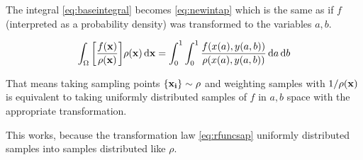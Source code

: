 The integral \cref{eq:baseintegral} becomes \cref{eq:newintap} which
is the same as if \(f\) (interpreted as a probability density) was
transformed to the variables \(a, b\).

\begin{equation}
  \label{eq:newintap}
  \int_\Omega
  \qty[\frac{f(\vb{x})}{\rho(\vb{x})}] \rho(\vb{x}) \dd{\vb{x}} =
  \int_0^1\int_0^1 \frac{f(x(a), y(a,b))}{\rho(x(a), y(a, b))} \dd{a}\dd{b}
\end{equation}

That means taking sampling points \(\{\vb{x_i}\}\sim \rho\) and
weighting samples with \(1/\rho(\vb{x})\) is equivalent to taking
uniformly distributed samples of \(f\) in \(a,b\) space with the
appropriate transformation.

This works, because the transformation law \cref{eq:rfuncsap}
uniformly distributed samples into samples distributed like \(\rho\).

